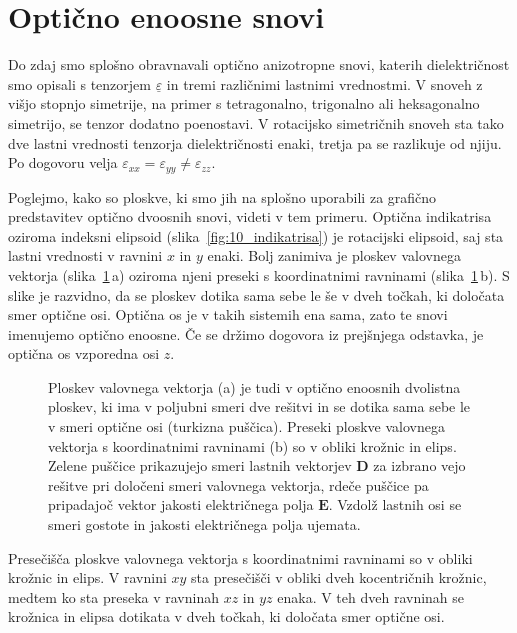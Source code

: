 \section{Optično enoosne snovi}
Do zdaj smo splošno obravnavali optično anizotropne snovi, katerih dielektričnost
smo opisali s tenzorjem $\underline{\varepsilon}$ in tremi različnimi lastnimi vrednostmi. 
V snoveh z višjo stopnjo simetrije, na primer s tetragonalno, trigonalno ali heksagonalno
simetrijo, se tenzor dodatno poenostavi. V rotacijsko simetričnih snoveh sta tako dve lastni 
vrednosti tenzorja dielektričnosti enaki, tretja pa se razlikuje od njiju.
Po dogovoru velja $\varepsilon_{xx} = \varepsilon_{yy}\neq \varepsilon_{zz}$.

Poglejmo, kako so ploskve, ki smo jih na splošno uporabili za grafično predstavitev optično
dvoosnih snovi, videti v tem primeru. Optična indikatrisa oziroma indeksni elipsoid 
(slika~\ref{fig:10_indikatrisa}) je rotacijski elipsoid, saj sta lastni vrednosti
v ravnini $x$ in $y$ enaki. Bolj zanimiva je ploskev valovnega vektorja 
(slika~\ref{fig:10_ploskev_3D_eno}\,a)
oziroma njeni preseki s koordinatnimi ravninami (slika~\ref{fig:10_ploskev_3D_eno}\,b). 
S slike je razvidno, da se ploskev dotika sama sebe le še v dveh točkah, ki določata 
smer optične osi. Optična os je v takih sistemih ena sama, zato te snovi imenujemo optično 
enoosne. Če se držimo dogovora iz prejšnjega odstavka, je optična os vzporedna osi $z$.
\begin{figure}[h]
\centering
\def\svgwidth{130truemm} 

\caption{Ploskev valovnega vektorja (a) je tudi v optično enoosnih dvolistna ploskev, 
ki ima v poljubni smeri dve rešitvi in se dotika sama sebe le v smeri optične osi 
(turkizna puščica). Preseki ploskve valovnega vektorja
s koordinatnimi ravninami (b) so v obliki krožnic in elips.
Zelene puščice prikazujejo smeri lastnih vektorjev $\mathbf{D}$ za izbrano vejo rešitve pri 
določeni smeri valovnega vektorja, rdeče puščice pa pripadajoč vektor jakosti električnega polja 
$\mathbf{E}$. Vzdolž lastnih osi se smeri gostote in jakosti električnega polja ujemata.}
\label{fig:10_ploskev_3D_eno}
\end{figure}

Presečišča ploskve valovnega vektorja s koordinatnimi ravninami so v obliki krožnic
in elips. V ravnini $xy$ sta presečišči v obliki dveh kocentričnih krožnic, medtem ko sta 
preseka v ravninah $xz$ in $yz$ enaka. V teh dveh ravninah
se krožnica in elipsa dotikata v dveh točkah, ki določata smer optične osi.

